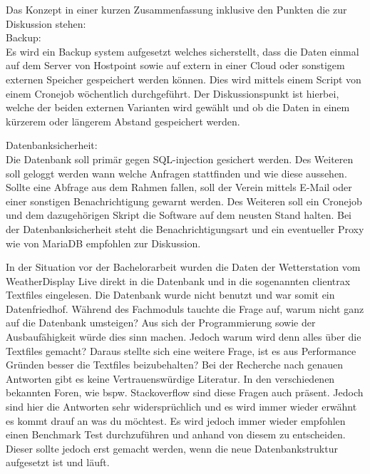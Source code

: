 
Das Konzept in einer kurzen Zusammenfassung inklusive den Punkten die zur Diskussion stehen:\\
Backup:\\
Es wird ein Backup system aufgesetzt welches sicherstellt, dass die Daten einmal auf dem Server von Hostpoint sowie auf extern in einer Cloud oder sonstigem externen Speicher gespeichert werden können. Dies wird mittels einem Script von einem Cronejob wöchentlich durchgeführt. Der Diskussionspunkt ist hierbei, welche der beiden externen Varianten wird gewählt und ob die Daten in einem kürzerem oder längerem Abstand gespeichert werden.

Datenbanksicherheit:\\
Die Datenbank soll primär gegen SQL-injection gesichert werden. Des Weiteren soll geloggt werden wann welche Anfragen stattfinden und wie diese aussehen. Sollte eine Abfrage aus dem Rahmen fallen, soll der Verein mittels E-Mail oder einer sonstigen Benachrichtigung gewarnt werden. Des Weiteren soll ein Cronejob und dem dazugehörigen Skript die Software auf dem neusten Stand halten. Bei der Datenbanksicherheit steht die Benachrichtigungsart und ein eventueller Proxy wie von MariaDB empfohlen zur Diskussion. 

In der Situation vor der Bachelorarbeit wurden die Daten der Wetterstation vom WeatherDisplay Live direkt in die Datenbank und in die sogenannten clientrax Textfiles eingelesen. Die Datenbank wurde nicht benutzt und war somit ein Datenfriedhof. Während des Fachmoduls tauchte die Frage auf, warum nicht ganz auf die Datenbank umsteigen? Aus sich der Programmierung sowie der Ausbaufähigkeit würde dies sinn machen. Jedoch warum wird denn alles über die Textfiles gemacht? Daraus stellte sich eine weitere Frage, ist es aus Performance Gründen besser die Textfiles beizubehalten?  Bei der Recherche nach genauen Antworten gibt es keine Vertrauenswürdige Literatur. In den verschiedenen bekannten Foren, wie bspw. Stackoverflow sind diese Fragen auch präsent. Jedoch sind hier die Antworten sehr widersprüchlich und es wird immer wieder erwähnt es kommt drauf an was du möchtest. Es wird jedoch immer wieder empfohlen einen Benchmark Test durchzuführen und anhand von diesem zu entscheiden. Dieser sollte jedoch erst gemacht werden, wenn die neue Datenbankstruktur aufgesetzt ist und läuft. 

